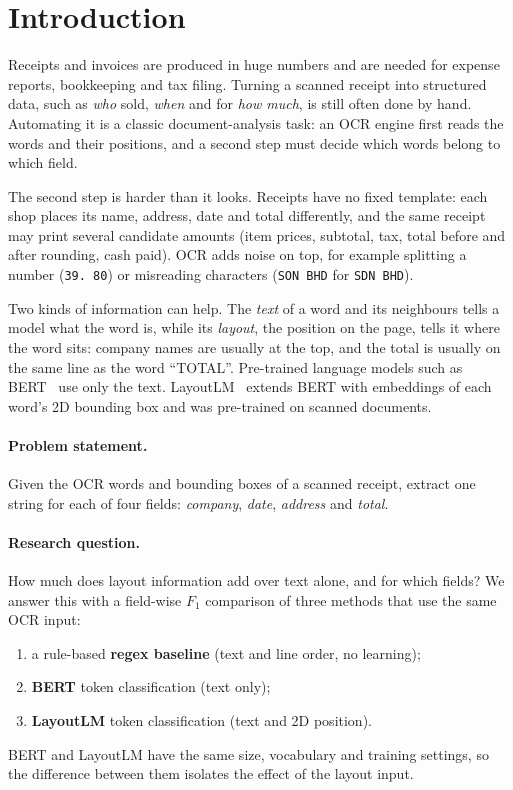 
\section{Introduction}
\label{sec:intro}

Receipts and invoices are produced in huge numbers and are needed for
expense reports, bookkeeping and tax filing. Turning a scanned receipt
into structured data, such as \emph{who} sold, \emph{when} and for
\emph{how much}, is still often done by hand. Automating it is a classic
document-analysis task: an OCR engine first reads the words and their
positions, and a second step must decide which words belong to which
field.

The second step is harder than it looks. Receipts have no fixed
template: each shop places its name, address, date and total
differently, and the same receipt may print several candidate amounts
(item prices, subtotal, tax, total before and after rounding, cash
paid). OCR adds noise on top, for example splitting a number
(\texttt{39. 80}) or misreading characters (\texttt{SON BHD} for
\texttt{SDN BHD}).

Two kinds of information can help. The \emph{text} of a word and its
neighbours tells a model what the word is, while its \emph{layout}, the
position on the page, tells it where the word sits: company names are
usually at the top, and the total is usually on the same line as the
word ``TOTAL''. Pre-trained language models such as
BERT~\cite{devlin2019bert} use only the text. LayoutLM~\cite{xu2020layoutlm}
extends BERT with embeddings of each word's 2D bounding box and was
pre-trained on scanned documents.

\paragraph{Problem statement.} Given the OCR words and bounding boxes of
a scanned receipt, extract one string for each of four fields:
\emph{company}, \emph{date}, \emph{address} and \emph{total}.

\paragraph{Research question.} How much does layout information add
over text alone, and for which fields? We answer this with a field-wise
$F_1$ comparison of three methods that use the same OCR input:
\begin{enumerate}
  \item a rule-based \textbf{regex baseline} (text and line order, no learning);
  \item \textbf{BERT} token classification (text only);
  \item \textbf{LayoutLM} token classification (text and 2D position).
\end{enumerate}
BERT and LayoutLM have the same size, vocabulary and training settings,
so the difference between them isolates the effect of the layout input.

